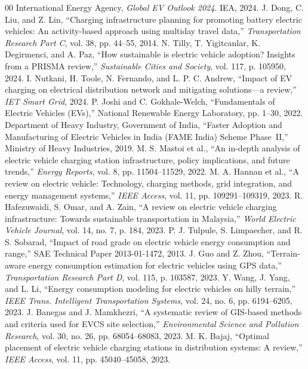 \documentclass[conference]{IEEEtran}
\begin{document}
\begin{thebibliography}{00}
 International Energy Agency, \textit{Global EV Outlook 2024}. IEA, 2024.
 J. Dong, C. Liu, and Z. Lin, ``Charging infrastructure planning for promoting battery electric vehicles: An activity-based approach using multiday travel data,'' \textit{Transportation Research Part C}, vol. 38, pp. 44--55, 2014.
 N. Tilly, T. Yigitcanlar, K. Degirmenci, and A. Paz, ``How sustainable is electric vehicle adoption? Insights from a PRISMA review,'' \textit{Sustainable Cities and Society}, vol. 117, p. 105950, 2024.
 I. Nutkani, H. Toole, N. Fernando, and L. P. C. Andrew, ``Impact of EV charging on electrical distribution network and mitigating solutions---a review,'' \textit{IET Smart Grid}, 2024.
 P. Joshi and C. Gokhale-Welch, ``Fundamentals of Electric Vehicles (EVs),'' National Renewable Energy Laboratory, pp. 1--30, 2022.
 Department of Heavy Industry, Government of India, ``Faster Adoption and Manufacturing of Electric Vehicles in India (FAME India) Scheme Phase~II,'' Ministry of Heavy Industries, 2019.
 M. S. Mastoi et al., ``An in-depth analysis of electric vehicle charging station infrastructure, policy implications, and future trends,'' \textit{Energy Reports}, vol. 8, pp. 11504--11529, 2022.
 M. A. Hannan et al., ``A review on electric vehicle: Technology, charging methods, grid integration, and energy management systems,'' \textit{IEEE Access}, vol. 11, pp. 109291--109319, 2023.
 R. Hafezuwaidi, S. Omar, and A. Zain, ``A review on electric vehicle charging infrastructure: Towards sustainable transportation in Malaysia,'' \textit{World Electric Vehicle Journal}, vol. 14, no. 7, p. 184, 2023.
 P. J. Tulpule, S. Limpaecher, and R. S. Sobarad, ``Impact of road grade on electric vehicle energy consumption and range,'' SAE Technical Paper 2013-01-1472, 2013.
 J. Guo and Z. Zhou, ``Terrain-aware energy consumption estimation for electric vehicles using GPS data,'' \textit{Transportation Research Part D}, vol. 115, p. 103587, 2023.
 Y. Wang, J. Yang, and L. Li, ``Energy consumption modeling for electric vehicles on hilly terrain,'' \textit{IEEE Trans. Intelligent Transportation Systems}, vol. 24, no. 6, pp. 6194--6205, 2023.
 J. Banegas and J. Mamkhezri, ``A systematic review of GIS-based methods and criteria used for EVCS site selection,'' \textit{Environmental Science and Pollution Research}, vol. 30, no. 26, pp. 68054--68083, 2023.
 M. K. Bajaj, ``Optimal placement of electric vehicle charging stations in distribution systems: A review,'' \textit{IEEE Access}, vol. 11, pp. 45040--45058, 2023.

\end{thebibliography}
\end{document}
